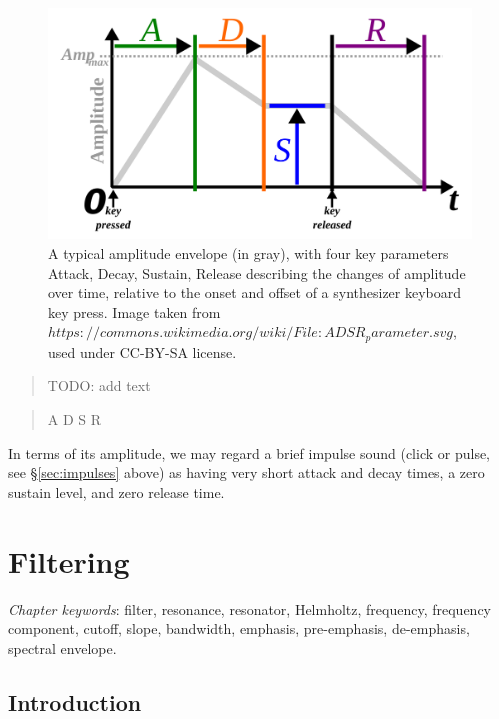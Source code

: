 \documentclass[
]{book}
\begin{document}
\begin{figure}

{\centering \includegraphics{figures/ADSR_parameter} 

}

\caption{A typical amplitude envelope (in gray), with four key parameters Attack, Decay, Sustain, Release describing the changes of amplitude over time, relative to the onset and offset of a synthesizer keyboard key press. Image taken from  $https://commons.wikimedia.org/wiki/File:ADSR_parameter.svg$, used under CC-BY-SA license.}\label{fig:envelope}
\end{figure}

\begin{quote}
TODO: add text
\end{quote}

\begin{quote}
A
D
S
R
\end{quote}

In terms of its amplitude, we may regard a brief impulse sound (click or pulse, see §\ref{sec:impulses} above) as having very short attack and decay times, a zero sustain level, and zero release time.

\chapter{Filtering}\label{ch-filtering}

\emph{Chapter keywords}: filter, resonance, resonator, Helmholtz, frequency, frequency component, cutoff, slope, bandwidth, emphasis, pre-emphasis, de-emphasis, spectral envelope.

\section{Introduction}\label{introduction}
\end{document}
